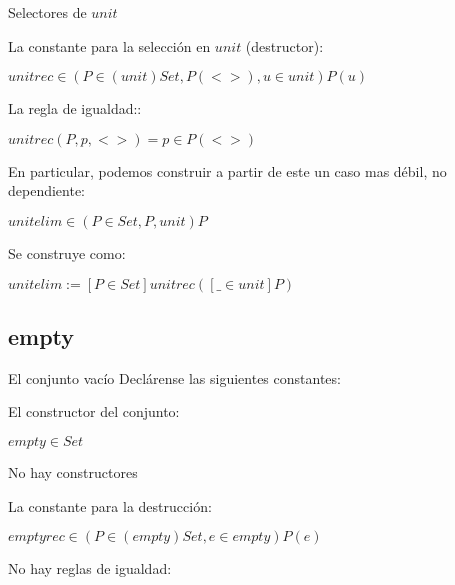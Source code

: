 \documentclass{beamer}
\begin{document}
\begin{frame}{Selectores de $unit$}
  \pause
  
  La constante para la selecci\'on en $unit$ (destructor):

  \pause
  
  \begin{center}
    $unitrec \in (P \in (unit)Set, P(<>),u \in unit) P(u)$
  \end{center}

  \pause
  La regla de igualdad::

  \begin{center}
    $unitrec(P,p,<>) = p \in P(<>)$
  \end{center}
  

\end{frame}


\begin{frame}

  En particular, podemos construir a partir de este
  un caso mas d\'ebil, no dependiente:

  \begin{center}
    $unitelim \in (P \in Set, P, unit) P $
  \end{center}

  \pause

  Se construye como:

  \begin{center}
    $ unitelim := [P \in Set] unitrec ([\_\in unit] P)$
  \end{center}

  \pause
  
\end{frame}




\subsection{empty}



\begin{frame}{El conjunto vac\'io}
  Decl\'arense las siguientes constantes:\\

  \pause

  El constructor del conjunto:
  
  \pause
  \begin{center}
    $empty \in Set$
  \end{center}
  \pause
  
  No hay constructores  

  \pause
  La constante para la destrucci\'on:

  \pause
  
  \begin{center}
    $emptyrec \in (P \in (empty)Set, e \in empty) P(e)$
  \end{center}

  \pause
  No hay reglas de igualdad:
  
\end{frame}
\end{document}
